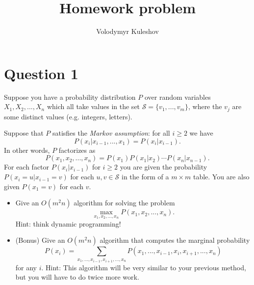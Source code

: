 \documentclass[12pt]{article}
\title{Homework problem}
\author{Volodymyr Kuleshov}
\date{}
\newcommand{\Sc}{{\mathcal S}}
\begin{document}


\maketitle

\section{Question 1}

Suppose you have a probability distribution $P$ over random variables $X_1,X_2,...,X_n$ which all take values in the set $\Sc = \{v_1,...,v_m\}$, where the $v_j$ are some distinct values (e.g. integers, letters).

Suppose that $P$ satisfies the {\em Markov assumption}: for all $i \geq 2$ we have
$$ P(x_i | x_{i-1}, ..., x_1) = P(x_i | x_{i-1}). $$
In other words, $P$ factorizes as
$$ P(x_1,x_2,...,x_n) = P(x_1) P(x_1|x_2) \cdots P(x_n|x_{n-1}). $$
For each factor $P(x_i | x_{i-1})$ for $i\geq2$ you are given the probability $P(x_i = u | x_{i-1} = v)$ for each $u, v \in \Sc$ in the form of a $m \times m$ table. You are also given $P(x_1=v)$ for each $v$.

\begin{itemize}
\item Give an $O(m^2n)$ algorithm for solving the problem
$$ \max_{x_1,x_2,...,x_n} P(x_1,x_2,...,x_n). $$
Hint: think dynamic programming!
\item (Bonus) Give an $O(m^2n)$ algorithm that computes the marginal probability
$$ P(x_i) = \sum_{x_1,..., x_{i-1}, x_{i+1},...,x_n} P(x_1,..., x_{i-1}, x_i, x_{i+1},...,x_n) $$
for any $i$.
Hint: This algorithm will be very similar to your previous method, but you will have to do twice more work.
\end{itemize}
\end{document}
